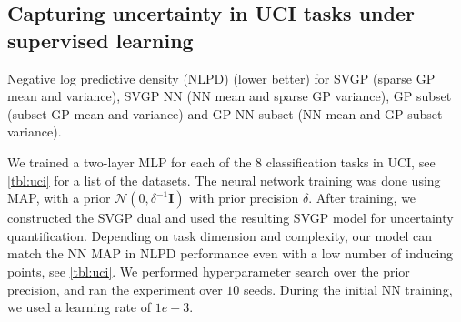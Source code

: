 \documentclass{article}
\newlength{\tblw}
\newcommand{\mbf}[1]{\mathbf{#1}}
\newcommand{\MI}{\mbf{I}}
\begin{document}
%

\subsection{Capturing uncertainty in UCI tasks under supervised learning}
\label{sec:uci}
%


\begin{table}[t!] 
  \centering\scriptsize
  \caption{Negative log predictive density (NLPD) (lower better) for SVGP (sparse GP mean and variance), SVGP NN (NN mean and sparse GP variance), GP subset (subset GP mean and variance) and GP NN subset (NN mean and GP subset variance). } 
	\label{tbl:uci}
	\renewcommand{\arraystretch}{1.}
	\setlength{\tabcolsep}{2pt}
	\setlength{\tblw}{0.14\textwidth}  
	
	\newcommand{\val}[2]{%
		$#1$\textcolor{gray}{\tiny ${\pm}#2$}
	} 

	
\end{table}
We trained a two-layer MLP for each of the $8$ classification tasks in UCI, see \cref{tbl:uci} for a list of the datasets. The neural network training was done using MAP, with a prior $\mathcal{N}(0,\delta^{-1} \MI)$ with prior precision $\delta$. After training, we constructed the SVGP dual and used the resulting SVGP model for uncertainty quantification. Depending on task dimension and complexity, our model can match the NN MAP in NLPD performance even with a low number of inducing points, see \cref{tbl:uci}. We performed hyperparameter search over the prior precision, and ran the experiment over $10$ seeds. During the initial NN training, we used a learning rate of $1e-3$.
\end{document}
